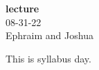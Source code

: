 



\begin{center}
	{\large \bf lecture }   \\ \large 08-31-22 \\ Ephraim and Joshua
\end{center}

This is syllabus day.






